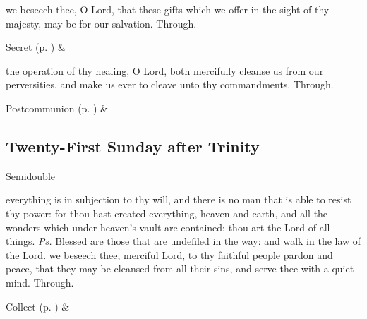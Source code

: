 
\secret
{} we beseech thee, O Lord, that these gifts which we offer in the sight of thy majesty, may be for our salvation. Through.


\begin{rubric}
     Secret  (p. \pageref{SPSaints}) \&  
\end{rubric}

\postcommunion
{} the operation of thy healing, O Lord, both mercifully cleanse us from our perversities, and make us ever to cleave unto thy commandments. Through.
\begin{rubric}
     Postcommunion  (p. \pageref{SPSaints}) \&  
\end{rubric}


\clearpage
\subsection{Twenty-First Sunday after Trinity}\label{trinity}
\begin{inhead}
{Semidouble}
\end{inhead}


\introit
{} everything is in subjection to thy will, and there is no man that is able to resist thy power: for thou hast created everything, heaven and earth, and all the wonders which under heaven's vault are contained: thou art the Lord of all things. \textit{Ps.} Blessed are those that are undefiled in the way: and walk in the law of the Lord.
\collect
{} we beseech thee, merciful Lord, to thy faithful people pardon and peace, that they may be cleansed from all their sins, and serve thee with a quiet mind. Through.
\begin{rubric}
     Collect  (p. \pageref{SPSaints}) \&  
\end{rubric}

